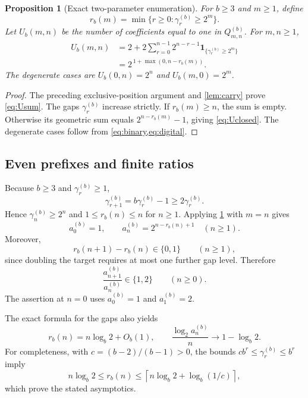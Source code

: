 \documentclass[11pt,letterpaper]{article}
\numberwithin{equation}{section}
\newtheorem{proposition}[proposition]{Proposition}
\theoremstyle{definition}
\theoremstyle{remark}
\newcommand{\ceil}[1]{\left\lceil#1\right\rceil}
\newcommand{\ind}[1]{\mathbf 1_{\{#1\}}}
\begin{document}
\begin{proposition}[Exact two-parameter enumeration]\label{prop:U}
For $b\ge3$ and $m\ge1$, define
\begin{equation}\label{eq:rdef}
 r_b(m)=\min\{r\ge0:\gamma_r^{(b)}\ge2^m\}.
\end{equation}
Let $U_b(m,n)$ be the number of coefficients equal to one in $Q_{m,n}^{(b)}$. For $m,n\ge1$,
\begin{align}
 U_b(m,n)
 &=2+2\sum_{r=0}^{n-1}2^{n-r-1}\ind{\gamma_r^{(b)}\ge2^m}\label{eq:Usum}\\
 &=2^{\,1+\max(0,n-r_b(m))}.\label{eq:Uclosed}
\end{align}
The degenerate cases are $U_b(0,n)=2^n$ and $U_b(m,0)=2^m$.
\end{proposition}
\begin{proof}
The preceding exclusive-position argument and \cref{lem:carry} prove \eqref{eq:Usum}. The gaps $\gamma_r^{(b)}$ increase strictly. If $r_b(m)\ge n$, the sum is empty. Otherwise its geometric sum equals $2^{n-r_b(m)}-1$, giving \eqref{eq:Uclosed}. The degenerate cases follow from \cref{eq:binary,eq:digital}.
\end{proof}

\subsection{Even prefixes and finite ratios}
Because $b\ge3$ and $\gamma_r^{(b)}\ge1$,
\begin{equation}\label{eq:gapdoubling}
 \gamma_{r+1}^{(b)}=b\gamma_r^{(b)}-1
 \ge2\gamma_r^{(b)}.
\end{equation}
Hence $\gamma_n^{(b)}\ge2^n$ and $1\le r_b(n)\le n$ for $n\ge1$. Applying \cref{prop:U} with $m=n$ gives
\begin{equation}\label{eq:abthreshold}
 a_0^{(b)}=1,\qquad
 a_n^{(b)}=2^{n-r_b(n)+1}\quad(n\ge1).
\end{equation}
Moreover,
\begin{equation}\label{eq:increment}
 r_b(n+1)-r_b(n)\in\{0,1\}\qquad(n\ge1),
\end{equation}
since doubling the target requires at most one further gap level. Therefore
\begin{equation}\label{eq:quotients}
 \frac{a_{n+1}^{(b)}}{a_n^{(b)}}\in\{1,2\}\qquad(n\ge0).
\end{equation}
The assertion at $n=0$ uses $a_0^{(b)}=1$ and $a_1^{(b)}=2$.

The exact formula for the gaps also yields
\begin{equation}\label{eq:thresholdasymp}
 r_b(n)=n\log_b2+O_b(1),\qquad
 \frac{\log_2 a_n^{(b)}}{n}\longrightarrow1-\log_b2.
\end{equation}
For completeness, with $c=(b-2)/(b-1)>0$, the bounds
$c b^r\le\gamma_r^{(b)}\le b^r$ imply
\[
 n\log_b2\le r_b(n)\le\ceil{n\log_b2+\log_b(1/c)},
\]
which prove the stated asymptotics.
\end{document}
